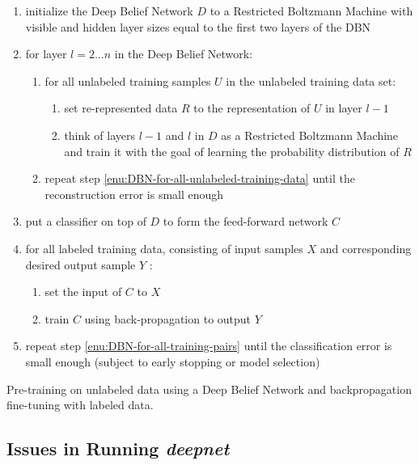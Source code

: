 \begin{algorithm}
\begin{enumerate}
\item initialize the Deep Belief Network $D$ to a Restricted Boltzmann
Machine with visible and hidden layer sizes equal to the first two
layers of the DBN
\item for layer $l=2\ldots n$ in the Deep Belief Network:

\begin{enumerate}
\item \label{enu:DBN-for-all-unlabeled-training-data}for all unlabeled
training samples $U$ in the unlabeled training data set:

\begin{enumerate}
\item set re-represented data $R$ to the representation of $U$ in layer
$l-1$
\item think of layers $l-1$ and $l$ in $D$ as a Restricted Boltzmann
Machine and train it with the goal of learning the probability distribution
of $R$
\end{enumerate}
\item repeat step \ref{enu:DBN-for-all-unlabeled-training-data} until the
reconstruction error is small enough
\end{enumerate}
\item put a classifier on top of $D$ to form the feed-forward network $C$
\item \label{enu:DBN-for-all-training-pairs}for all labeled training data,
consisting of input samples $X$ and corresponding desired output
sample $Y$ :

\begin{enumerate}
\item set the input of $C$ to $X$
\item train $C$ using back-propagation to output $Y$
\end{enumerate}
\item repeat step \ref{enu:DBN-for-all-training-pairs} until the classification
error is small enough (subject to early stopping or model selection)
\end{enumerate}
\caption{\label{alg:pretrain-DBN-finetune-backprop}Pre-training on unlabeled
data using a Deep Belief Network and backpropagation fine-tuning with
labeled data.}
\end{algorithm}

\subsection{Issues in Running \emph{deepnet}}


